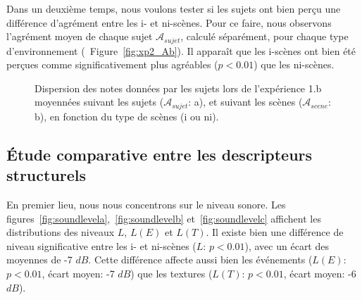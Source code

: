 Dans un deuxième temps, nous voulons tester si les sujets ont bien perçu une différence d'agrément entre les i- et ni-scènes. Pour ce faire, nous observons l'agrément moyen de chaque sujet $\mathcal{A}_{sujet}$, calculé séparément, pour chaque type d'environnement (\cf~Figure~\ref{fig:xp2_Ab}). Il apparaît que les i-scènes ont bien été perçues comme significativement plus agréables ($p<0.01$) que les ni-scènes.

\begin{figure}[t]
        \myfloatalign
       \caption{Dispersion des notes données par les sujets lors de l'expérience 1.b moyennées suivant les sujets ($\mathcal{A}_{sujet}$: a), et suivant les scènes ($\mathcal{A}_{scene}$: b), en fonction du type de scènes (i ou ni).}\label{fig:xp2_A}
\end{figure}
 
\subsection{Étude comparative entre les descripteurs structurels}

En premier lieu, nous nous concentrons sur le niveau sonore. Les figures~\ref{fig:soundlevela},~\ref{fig:soundlevelb} et~\ref{fig:soundlevelc} affichent les distributions des niveaux $L$, $L(E)$ et $L(T)$. Il existe bien une différence de niveau significative entre les i- et ni-scènes ($L$: $p<0.01$), avec un écart des moyennes de -7 $dB$. Cette différence affecte aussi bien les événements ($L(E)$: $p<0.01$, écart moyen: -7 $dB$) que les textures ($L(T)$: $p<0.01$, écart moyen: -6 $dB$). 

